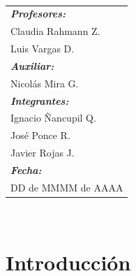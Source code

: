 \documentclass[12pt, letterpaper]{article}
\begin{document}
\begin{titlepage}
\begin{minipage}{.5\textwidth}
~
\end{minipage}
\begin{minipage}{.45\textwidth}
\begin{flushright}
\begin{tabular}{l}
\textbf{\textit{Profesores:}} \\
{\small Claudia Rahmann Z.}\\
{\small Luis Vargas D.}\\[0.3cm]
\textbf{\textit{Auxiliar:}} \\
{\small Nicolás Mira G.}\\[0.3cm]
\textbf{\textit{Integrantes:}}\\
{\small Ignacio Ñancupil Q.}\\
{\small José Ponce R.}\\
{\small Javier Rojas J.}\\[.3cm]
\textbf{\textit{Fecha:}}\\
{\small DD de MMMM de AAAA}
\end{tabular}
\end{flushright}
\end{minipage}
\begin{minipage}{.05\textwidth}
~
\end{minipage}
\end{titlepage}

\restoregeometry

\setcounter{page}{1}
\tableofcontents 
\newpage
\listoffigures
\listoftables
\lstlistoflistings


\newpage
{}
\setcounter{page}{1}

\newpage
\section{Introducción}
\end{document}
